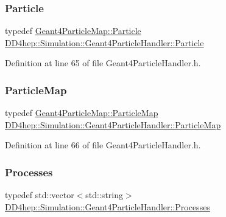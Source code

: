 \subsubsection{\texorpdfstring{Particle}{Particle}}
{\footnotesize\ttfamily typedef \hyperlink{class_d_d4hep_1_1_simulation_1_1_geant4_particle_map_a01ed68f2fc2e55ecf936e5ac3e6eae5f}{Geant4\+Particle\+Map\+::\+Particle} \hyperlink{class_d_d4hep_1_1_simulation_1_1_geant4_particle_handler_a69214f487c50f6fd550571f37e715117}{D\+D4hep\+::\+Simulation\+::\+Geant4\+Particle\+Handler\+::\+Particle}}



Definition at line 65 of file Geant4\+Particle\+Handler.\+h.

\hypertarget{class_d_d4hep_1_1_simulation_1_1_geant4_particle_handler_a79cf5fe4ceb492dff4d3458306a08973}{}\label{class_d_d4hep_1_1_simulation_1_1_geant4_particle_handler_a79cf5fe4ceb492dff4d3458306a08973} 
\subsubsection{\texorpdfstring{Particle\+Map}{ParticleMap}}
{\footnotesize\ttfamily typedef \hyperlink{class_d_d4hep_1_1_simulation_1_1_geant4_particle_map_a065c5fb0629285022b9aa2a628bffef3}{Geant4\+Particle\+Map\+::\+Particle\+Map} \hyperlink{class_d_d4hep_1_1_simulation_1_1_geant4_particle_handler_a79cf5fe4ceb492dff4d3458306a08973}{D\+D4hep\+::\+Simulation\+::\+Geant4\+Particle\+Handler\+::\+Particle\+Map}}



Definition at line 66 of file Geant4\+Particle\+Handler.\+h.

\hypertarget{class_d_d4hep_1_1_simulation_1_1_geant4_particle_handler_a80c1482fd25ec687f429854033ac3f79}{}\label{class_d_d4hep_1_1_simulation_1_1_geant4_particle_handler_a80c1482fd25ec687f429854033ac3f79} 
\subsubsection{\texorpdfstring{Processes}{Processes}}
{\footnotesize\ttfamily typedef std\+::vector$<$std\+::string$>$ \hyperlink{class_d_d4hep_1_1_simulation_1_1_geant4_particle_handler_a80c1482fd25ec687f429854033ac3f79}{D\+D4hep\+::\+Simulation\+::\+Geant4\+Particle\+Handler\+::\+Processes}}



